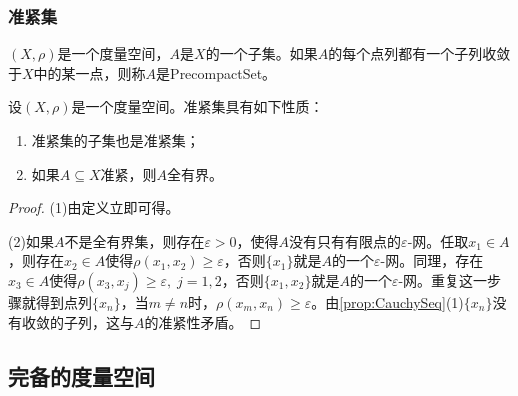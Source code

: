 \subsubsection{准紧集}
\begin{definition}
	$(X,\rho)$是一个度量空间，$A$是$X$的一个子集。如果$A$的每个点列都有一个子列收敛于$X$中的某一点，则称$A$是\gls{PrecompactSet}。
\end{definition}
\begin{property}\label{prop:PrecompactSet}
	设$(X,\rho)$是一个度量空间。准紧集具有如下性质：
	\begin{enumerate}
		\item 准紧集的子集也是准紧集；
		\item 如果$A\subseteq X$准紧，则$A$全有界。
	\end{enumerate}
\end{property}
\begin{proof}
	(1)由定义立即可得。\par
	(2)如果$A$不是全有界集，则存在$\varepsilon>0$，使得$A$没有只有有限点的$\varepsilon$-网。任取$x_1\in A$，则存在$x_2\in A$使得$\rho(x_1,x_2)\geqslant\varepsilon$，否则$\{x_1\}$就是$A$的一个$\varepsilon$-网。同理，存在$x_3\in A$使得$\rho(x_3,x_j)\geqslant\varepsilon,\;j=1,2$，否则$\{x_1,x_2\}$就是$A$的一个$\varepsilon$-网。重复这一步骤就得到点列$\{x_n\}$，当$m\ne n$时，$\rho(x_m,x_n)\geqslant\varepsilon$。由\cref{prop:CauchySeq}(1)$\{x_n\}$没有收敛的子列，这与$A$的准紧性矛盾。\par
\end{proof}

\subsection{完备的度量空间}
